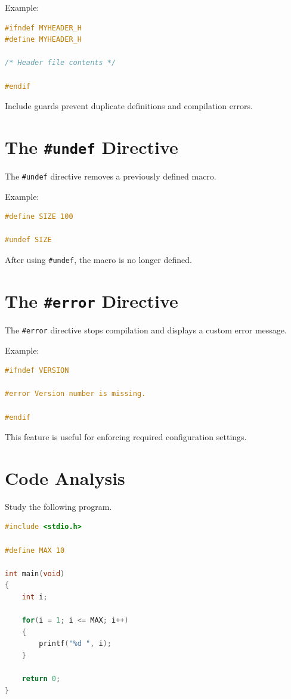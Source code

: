 \documentclass[12pt,openany]{book}
\begin{document}
Example:

\begin{lstlisting}[language=C]
#ifndef MYHEADER_H
#define MYHEADER_H

/* Header file contents */

#endif
\end{lstlisting}

Include guards prevent duplicate definitions and compilation errors.

\section{The \texttt{\#undef} Directive}

The \texttt{\#undef} directive removes a previously defined macro.

Example:

\begin{lstlisting}[language=C]
#define SIZE 100

#undef SIZE
\end{lstlisting}

After using \texttt{\#undef}, the macro is no longer defined.

\section{The \texttt{\#error} Directive}

The \texttt{\#error} directive stops compilation and displays a custom error message.

Example:

\begin{lstlisting}[language=C]
#ifndef VERSION

#error Version number is missing.

#endif
\end{lstlisting}

This feature is useful for enforcing required configuration settings.
\section{Code Analysis}

Study the following program.

\begin{lstlisting}[language=C]
#include <stdio.h>

#define MAX 10

int main(void)
{
    int i;

    for(i = 1; i <= MAX; i++)
    {
        printf("%d ", i);
    }

    return 0;
}
\end{lstlisting}
\end{document}
